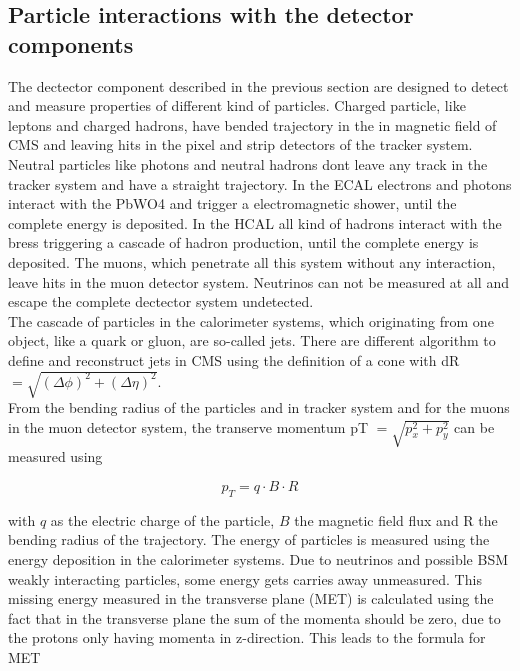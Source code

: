 \subsection{Particle interactions with the detector components}
\label{sec:section_2_2_3}

The dectector component described in the previous section are designed to detect and measure properties of different kind of particles. Charged particle, like leptons and charged hadrons, have bended trajectory in the in magnetic field of \gls{CMS} and leaving hits in the pixel and strip detectors of the tracker system. Neutral particles like photons and neutral hadrons dont leave any track in the tracker system and have a straight trajectory. In the \gls{ECAL} electrons and photons interact with the \gls{PbWO4} and trigger a electromagnetic shower, until the complete energy is deposited. In the \gls{HCAL} all kind of hadrons interact with the bress triggering a cascade of hadron production, until the complete energy is deposited. The muons, which penetrate all this system without any interaction, leave hits in the muon detector system. Neutrinos can not be measured at all and escape the complete dectector system undetected. \\

The cascade of particles in the calorimeter systems, which originating from one object, like a quark or gluon, are so-called jets. There are different algorithm to define and reconstruct jets in \gls{CMS} using the definition of a cone with \gls{dR} $= \sqrt{(\Delta \phi)^{2} + (\Delta \eta)^{2}}$.\\ 

From the bending radius of the particles and in tracker system and for the muons in the muon detector system, the transerve momentum \gls{pT} $= \sqrt{p_{x}^{2} + p_{y}^{2}}$ can be measured using 

\begin{equation}
	\label{eq:eq_2_5}
	p_{T} = q\cdot B \cdot R
\end{equation} 

with $q$ as the electric charge of the particle, $B$ the magnetic field flux and R the bending radius of the trajectory. The energy of particles is measured using the energy deposition in the calorimeter systems. Due to neutrinos and possible \gls{BSM} weakly interacting particles, some energy gets carries away unmeasured. This missing energy measured in the transverse plane (\gls{MET}) is calculated using the fact that in the transverse plane the sum of the momenta should be zero, due to the protons only having momenta in z-direction. This leads to the formula for \gls{MET}

